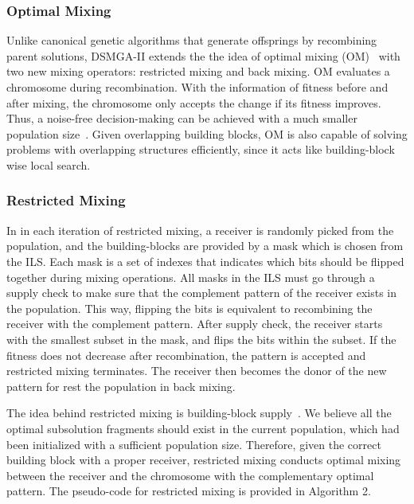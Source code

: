 \documentclass{sig-alternate-05-2015}
\begin{document}
\subsubsection{Optimal Mixing}
Unlike canonical genetic algorithms that generate offsprings by recombining parent solutions, DSMGA-II extends the the idea of optimal mixing (OM)~\cite{thierens:OM} with two new mixing operators: restricted mixing and back mixing. OM evaluates a chromosome during recombination. With the information of fitness before and after mixing, the chromosome only accepts the change if its fitness improves. Thus, a noise-free decision-making can be achieved with a much smaller population size~\cite{goldberg:buildingblock}. Given overlapping building blocks, OM is also capable of solving problems with overlapping structures efficiently, since it acts like building-block wise local search.


\subsubsection{Restricted Mixing}

In in each iteration of restricted mixing, a receiver is randomly picked from the population, and the building-blocks are provided by a mask which is chosen from the ILS. Each mask is a set of indexes that indicates which bits should be flipped together during mixing operations. All masks in the ILS must go through a supply check to make sure that the complement pattern of the receiver exists in the population. This way, flipping the bits is equivalent to recombining the receiver with the complement pattern. After supply check, the receiver starts with the smallest subset in the mask, and flips the bits within the subset. If the fitness does not decrease after recombination, the pattern is accepted and restricted mixing terminates. The receiver then becomes the donor of the new pattern for rest the population in back mixing. 


The idea behind restricted mixing is building-block supply~\cite{goldberg:buildingblock}. We believe all the optimal subsolution fragments should exist in the current population, which had been initialized with a sufficient population size. Therefore, given the correct building block with a proper receiver, restricted mixing conducts optimal mixing between the receiver and the chromosome with the complementary optimal pattern. The pseudo-code for  restricted mixing is provided in Algorithm 2.
\end{document}
